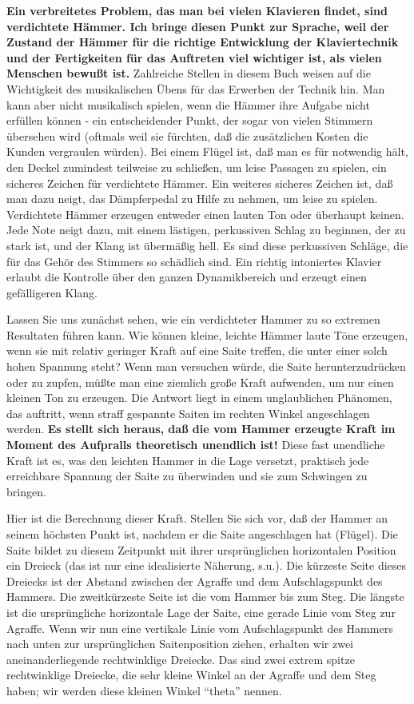 \textbf{Ein verbreitetes Problem, das man bei vielen Klavieren findet, sind verdichtete Hämmer.
 Ich bringe diesen Punkt zur Sprache, weil der Zustand der Hämmer für die richtige Entwicklung der Klaviertechnik und der Fertigkeiten für das Auftreten viel wichtiger ist, als vielen Menschen bewußt ist.}
 Zahlreiche Stellen in diesem Buch weisen auf die Wichtigkeit des musikalischen Übens für das Erwerben der Technik hin.
 Man kann aber nicht musikalisch spielen, wenn die Hämmer ihre Aufgabe nicht erfüllen können - ein entscheidender Punkt, der sogar von vielen Stimmern übersehen wird (oftmals weil sie fürchten, daß die zusätzlichen Kosten die Kunden vergraulen würden).
 Bei einem Flügel ist, daß man es für notwendig hält, den Deckel zumindest teilweise zu schließen, um leise Passagen zu spielen, ein sicheres Zeichen für verdichtete Hämmer.
 Ein weiteres sicheres Zeichen ist, daß man dazu neigt, das Dämpferpedal zu Hilfe zu nehmen, um leise zu spielen.
 Verdichtete Hämmer erzeugen entweder einen lauten Ton oder überhaupt keinen.
 Jede Note neigt dazu, mit einem lästigen, perkussiven Schlag zu beginnen, der zu stark ist, und der Klang ist übermäßig hell.
 Es sind diese perkussiven Schläge, die für das Gehör des Stimmers so schädlich sind.
 Ein richtig intoniertes Klavier erlaubt die Kontrolle über den ganzen Dynamikbereich und erzeugt einen gefälligeren Klang.
 

Lassen Sie uns zunächst sehen, wie ein verdichteter Hammer zu so extremen Resultaten führen kann.
 Wie können kleine, leichte Hämmer laute Töne erzeugen, wenn sie mit relativ geringer Kraft auf eine Saite treffen, die unter einer solch hohen Spannung steht?
 Wenn man versuchen würde, die Saite herunterzudrücken oder zu zupfen, müßte man eine ziemlich große Kraft aufwenden, um nur einen kleinen Ton zu erzeugen.
 Die Antwort liegt in einem unglaublichen Phänomen, das auftritt, wenn straff gespannte Saiten im rechten Winkel angeschlagen werden.
 \textbf{Es stellt sich heraus, daß die vom Hammer erzeugte Kraft im Moment des Aufpralls theoretisch unendlich ist!}
 Diese fast unendliche Kraft ist es, was den leichten Hammer in die Lage versetzt, praktisch jede erreichbare Spannung der Saite zu überwinden und sie zum Schwingen zu bringen.
 

Hier ist die Berechnung dieser Kraft.
 Stellen Sie sich vor, daß der Hammer an seinem höchsten Punkt ist, nachdem er die Saite angeschlagen hat (Flügel).
 Die Saite bildet zu diesem Zeitpunkt mit ihrer ursprünglichen horizontalen Position ein Dreieck (das ist nur eine idealisierte Näherung, s.u.).
 Die kürzeste Seite dieses Dreiecks ist der Abstand zwischen der Agraffe und dem Aufschlagspunkt des Hammers.
 Die zweitkürzeste Seite ist die vom Hammer bis zum Steg.
 Die längste ist die ursprüngliche horizontale Lage der Saite, eine gerade Linie vom Steg zur Agraffe.
 Wenn wir nun eine vertikale Linie vom Aufschlagspunkt des Hammers nach unten zur ursprünglichen Saitenposition ziehen, erhalten wir zwei aneinanderliegende rechtwinklige Dreiecke.
 Das sind zwei extrem spitze rechtwinklige Dreiecke, die sehr kleine Winkel an der Agraffe und dem Steg haben; wir werden diese kleinen Winkel \enquote{theta} nennen.
 

